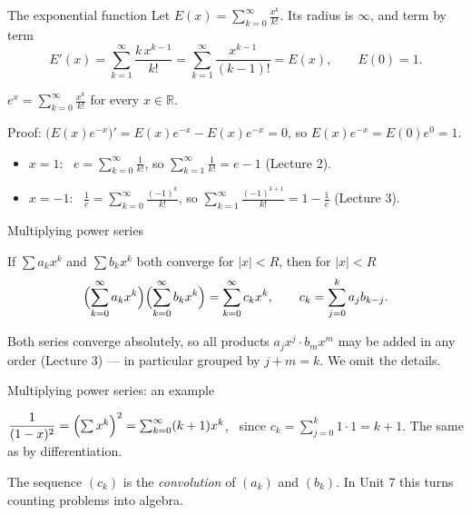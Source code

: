\documentclass{wosm-slides}
\newcommand{\R}{\mathbb{R}}
\begin{document}
\begin{frame}{The exponential function}
  Let $E(x) = \sum_{k=0}^\infty \frac{x^k}{k!}$. Its radius is $\infty$, and term by term
  \[ E'(x) = \sum_{k=1}^\infty \frac{k\, x^{k-1}}{k!} = \sum_{k=1}^\infty \frac{x^{k-1}}{(k-1)!}
     = E(x), \qquad E(0) = 1 . \]
  \pause
  \begin{theorem}
    $e^x = \sum_{k=0}^\infty \frac{x^k}{k!}$ for every $x \in \R$.
  \end{theorem}
  {\small Proof: $\bigl(E(x) e^{-x}\bigr)' = E(x) e^{-x} - E(x) e^{-x} = 0$, so
  $E(x) e^{-x} = E(0) e^0 = 1$.\par}
  \pause
  \begin{itemize}
    \item $x = 1$: \ $e = \sum_{k=0}^\infty \frac{1}{k!}$, so $\sum_{k=1}^\infty \frac{1}{k!} = e - 1$
      (Lecture 2).
    \item $x = -1$: \ $\frac1e = \sum_{k=0}^\infty \frac{(-1)^k}{k!}$, so
      $\sum_{k=1}^\infty \frac{(-1)^{k+1}}{k!} = 1 - \frac1e$ (Lecture 3).
  \end{itemize}
\end{frame}

\begin{frame}{Multiplying power series}
  \begin{theorem}
    If $\sum a_k x^k$ and $\sum b_k x^k$ both converge for $|x| < R$, then for $|x| < R$
    \[ \Bigl(\sum_{k=0}^\infty a_k x^k\Bigr) \Bigl(\sum_{k=0}^\infty b_k x^k\Bigr)
       = \sum_{k=0}^\infty c_k x^k, \qquad c_k = \sum_{j=0}^{k} a_j b_{k-j} . \]
  \end{theorem}
  {\small Both series converge absolutely, so all products $a_j x^j \cdot b_m x^m$ may be added
  in any order (Lecture 3) --- in particular grouped by $j + m = k$. We omit the details.\par}
\end{frame}

\begin{frame}{Multiplying power series: an example}
  \begin{example}
    $\dfrac{1}{(1-x)^2} = \Bigl(\sum x^k\Bigr)^2 = \sum_{k=0}^\infty (k+1) x^k$, \ since
    $c_k = \sum_{j=0}^k 1 \cdot 1 = k + 1$. The same as by differentiation.
  \end{example}
  {\small The sequence $(c_k)$ is the \emph{convolution} of $(a_k)$ and $(b_k)$.
  In Unit 7 this turns counting problems into algebra.\par}
\end{frame}
\end{document}
